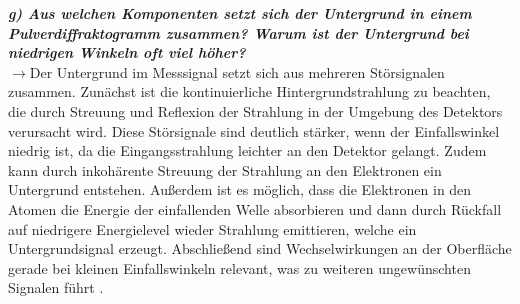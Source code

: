 \textbf{\textit{g) Aus welchen Komponenten setzt sich der Untergrund in einem 
Pulverdiffraktogramm zusammen? Warum ist der Untergrund bei niedrigen Winkeln
oft viel höher?}}\\
$\rightarrow$Der Untergrund im Messsignal setzt sich aus mehreren Störsignalen zusammen. 
Zunächst ist die kontinuierliche Hintergrundstrahlung zu beachten, die durch Streuung und Reflexion 
der Strahlung in der Umgebung des Detektors verursacht wird. Diese Störsignale 
sind deutlich stärker, wenn der Einfallswinkel niedrig ist, da die Eingangsstrahlung leichter
an den Detektor gelangt. 
Zudem kann durch inkohärente Streuung der Strahlung an den Elektronen ein Untergrund entstehen. 
Außerdem ist es möglich, dass die Elektronen in den Atomen die Energie der einfallenden 
Welle absorbieren und dann durch Rückfall auf niedrigere Energielevel wieder Strahlung emittieren, 
welche ein Untergrundsignal erzeugt. 
Abschließend sind Wechselwirkungen an der Oberfläche gerade bei kleinen 
Einfallswinkeln relevant, was zu weiteren ungewünschten Signalen führt \cite{Kristall, Schwarz, EPC}.
